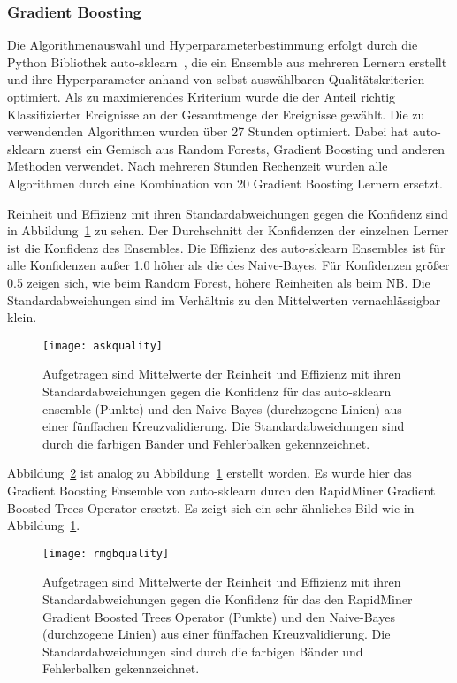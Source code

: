 \subsubsection{Gradient Boosting}
Die Algorithmenauswahl und Hyperparameterbestimmung erfolgt durch die Python Bibliothek auto-sklearn~\cite{autosklearn}, die ein Ensemble aus mehreren Lernern erstellt und ihre Hyperparameter anhand von selbst auswählbaren Qualitätskriterien optimiert.
Als zu maximierendes Kriterium wurde die der Anteil richtig Klassifizierter Ereignisse an der Gesamtmenge der Ereignisse gewählt.
Die zu verwendenden Algorithmen wurden über 27 Stunden optimiert.
Dabei hat auto-sklearn zuerst ein Gemisch aus Random Forests, Gradient Boosting und anderen Methoden verwendet.
Nach mehreren Stunden Rechenzeit wurden alle Algorithmen durch eine Kombination von 20 Gradient Boosting Lernern ersetzt.

Reinheit und Effizienz mit ihren Standardabweichungen gegen die Konfidenz sind in Abbildung~\ref{figaskquality} zu sehen.
Der Durchschnitt der Konfidenzen der einzelnen Lerner ist die Konfidenz des Ensembles.
Die Effizienz des auto-sklearn Ensembles ist für alle Konfidenzen außer 1.0 höher als die des Naive-Bayes.
Für Konfidenzen größer 0.5 zeigen sich, wie beim Random Forest, höhere Reinheiten als beim NB.
Die Standardabweichungen sind im Verhältnis zu den Mittelwerten vernachlässigbar klein.
\begin{figure}
  \centering
  \texttt{[image: askquality]}
\vspace{-1em}
    \caption{Aufgetragen sind Mittelwerte der Reinheit und Effizienz mit ihren Standardabweichungen gegen die Konfidenz für das auto-sklearn ensemble (Punkte) und den Naive-Bayes (durchzogene Linien) aus einer fünffachen Kreuzvalidierung. Die Standardabweichungen sind durch die farbigen Bänder und Fehlerbalken gekennzeichnet.}
  \label{figaskquality}
\end{figure}

Abbildung~\ref{figrmgbquality} ist analog zu Abbildung~\ref{figaskquality} erstellt worden.
Es wurde hier das Gradient Boosting Ensemble von auto-sklearn durch den RapidMiner Gradient Boosted Trees Operator ersetzt.
Es zeigt sich ein sehr ähnliches Bild wie in Abbildung~\ref{figaskquality}.
\begin{figure}
  \centering
  \texttt{[image: rmgbquality]}
\vspace{-1em}
    \caption{Aufgetragen sind Mittelwerte der Reinheit und Effizienz mit ihren Standardabweichungen gegen die Konfidenz für das den RapidMiner Gradient Boosted Trees Operator (Punkte) und den Naive-Bayes (durchzogene Linien) aus einer fünffachen Kreuzvalidierung. Die Standardabweichungen sind durch die farbigen Bänder und Fehlerbalken gekennzeichnet.}
  \label{figrmgbquality}
\end{figure}


